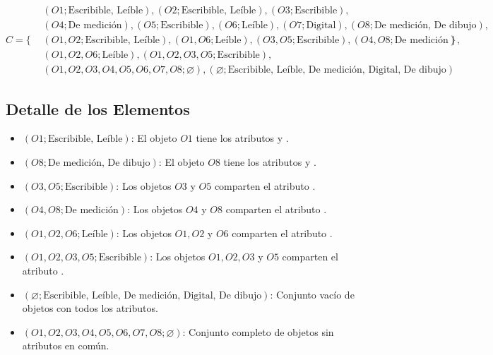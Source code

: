  \[
  C = \{
  \begin{aligned}
  & (O1; \text{Escribible, Leíble}), (O2; \text{Escribible, Leíble}), (O3; \text{Escribible}), \\
  & (O4; \text{De medición}), (O5; \text{Escribible}), (O6; \text{Leíble}), (O7; \text{Digital}), (O8; \text{De medición, De dibujo}), \\
  & (O1, O2; \text{Escribible, Leíble}), (O1, O6; \text{Leíble}), (O3, O5; \text{Escribible}), (O4, O8; \text{De medición}), \\
  & (O1, O2, O6; \text{Leíble}), (O1, O2, O3, O5; \text{Escribible}), \\
  & (O1, O2, O3, O4, O5, O6, O7, O8; \varnothing), (\varnothing; \text{Escribible, Leíble, De medición, Digital, De dibujo})
  \end{aligned}
  \}
  \]
  
  \subsection{Detalle de los Elementos}
  \begin{itemize}
      \item \( (O1; \text{Escribible, Leíble}) \): El objeto \( O1 \) tiene los atributos  y .
      \item \( (O8; \text{De medición, De dibujo}) \): El objeto \( O8 \) tiene los atributos y .
      \item \( (O3, O5; \text{Escribible}) \): Los objetos \( O3 \) y \( O5 \) comparten el atributo .
      \item \( (O4, O8; \text{De medición}) \): Los objetos \( O4 \) y \( O8 \) comparten el atributo .
      \item \( (O1, O2, O6; \text{Leíble}) \): Los objetos \( O1, O2 \) y \( O6 \) comparten el atributo .
      \item \( (O1, O2, O3, O5; \text{Escribible}) \): Los objetos \( O1, O2, O3 \) y \( O5 \) comparten el atributo .
      \item \( (\varnothing; \text{Escribible, Leíble, De medición, Digital, De dibujo}) \): Conjunto vacío de objetos con todos los atributos.
      \item \( (O1, O2, O3, O4, O5, O6, O7, O8; \varnothing) \): Conjunto completo de objetos sin atributos en común.
  \end{itemize}
  
